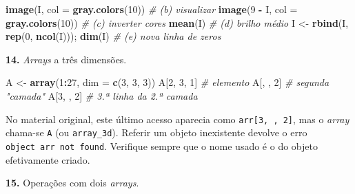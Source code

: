 \documentclass[
  portuguese,
  11pt,
  openany]{book}
\newenvironment{Shaded}{\begin{snugshade}}{\end{snugshade}}
\newcommand{\AttributeTok}[1]{\textcolor[rgb]{0.13,0.29,0.53}{#1}}
\newcommand{\CommentTok}[1]{\textcolor[rgb]{0.56,0.35,0.01}{\textit{#1}}}
\newcommand{\DecValTok}[1]{\textcolor[rgb]{0.00,0.00,0.81}{#1}}
\newcommand{\FunctionTok}[1]{\textcolor[rgb]{0.13,0.29,0.53}{\textbf{#1}}}
\newcommand{\NormalTok}[1]{#1}
\newcommand{\OtherTok}[1]{\textcolor[rgb]{0.56,0.35,0.01}{#1}}
\newcommand{\SpecialCharTok}[1]{\textcolor[rgb]{0.81,0.36,0.00}{\textbf{#1}}}
\begin{document}
\begin{Shaded}
\begin{Highlighting}[]
\FunctionTok{image}\NormalTok{(I, }\AttributeTok{col =} \FunctionTok{gray.colors}\NormalTok{(}\DecValTok{10}\NormalTok{))          }\CommentTok{\# (b) visualizar}
\FunctionTok{image}\NormalTok{(}\DecValTok{9} \SpecialCharTok{{-}}\NormalTok{ I, }\AttributeTok{col =} \FunctionTok{gray.colors}\NormalTok{(}\DecValTok{10}\NormalTok{))       }\CommentTok{\# (c) inverter cores}
\FunctionTok{mean}\NormalTok{(I)                                   }\CommentTok{\# (d) brilho médio}
\NormalTok{I }\OtherTok{\textless{}{-}} \FunctionTok{rbind}\NormalTok{(I, }\FunctionTok{rep}\NormalTok{(}\DecValTok{0}\NormalTok{, }\FunctionTok{ncol}\NormalTok{(I))); }\FunctionTok{dim}\NormalTok{(I)    }\CommentTok{\# (e) nova linha de zeros}
\end{Highlighting}
\end{Shaded}

\textbf{14.} \emph{Arrays} a três dimensões.

\begin{Shaded}
\begin{Highlighting}[]
\NormalTok{A }\OtherTok{\textless{}{-}} \FunctionTok{array}\NormalTok{(}\DecValTok{1}\SpecialCharTok{:}\DecValTok{27}\NormalTok{, }\AttributeTok{dim =} \FunctionTok{c}\NormalTok{(}\DecValTok{3}\NormalTok{, }\DecValTok{3}\NormalTok{, }\DecValTok{3}\NormalTok{))}
\NormalTok{A[}\DecValTok{2}\NormalTok{, }\DecValTok{3}\NormalTok{, }\DecValTok{1}\NormalTok{]     }\CommentTok{\# elemento}
\NormalTok{A[, , }\DecValTok{2}\NormalTok{]       }\CommentTok{\# segunda "camada"}
\NormalTok{A[}\DecValTok{3}\NormalTok{, , }\DecValTok{2}\NormalTok{]      }\CommentTok{\# 3.ª linha da 2.ª camada}
\end{Highlighting}
\end{Shaded}

No material original, este último acesso aparecia como \texttt{arr{[}3,\ ,\ 2{]}}, mas o
\emph{array} chama-se \texttt{A} (ou \texttt{array\_3d}). Referir um objeto inexistente devolve o
erro \texttt{object\ \textquotesingle{}arr\textquotesingle{}\ not\ found}. Verifique sempre que o nome usado é o do objeto
efetivamente criado.

\textbf{15.} Operações com dois \emph{arrays}.
\end{document}
